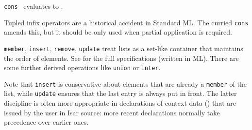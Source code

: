 \begin{isabellebody}
\begin{isamarkuptext}
  \begin{description}

  \item \verb|cons|~ evaluates to .

  Tupled infix operators are a historical accident in Standard ML.
  The curried \verb|cons| amends this, but it should be only used when
  partial application is required.

  \item \verb|member|, \verb|insert|, \verb|remove|, \verb|update| treat
  lists as a set-like container that maintains the order of elements.
  See \hyperlink{file.~~/src/Pure/library.ML}{\mbox{}} for the full specifications
  (written in ML).  There are some further derived operations like
  \verb|union| or \verb|inter|.

  Note that \verb|insert| is conservative about elements that are
  already a \verb|member| of the list, while \verb|update| ensures that
  the last entry is always put in front.  The latter discipline is
  often more appropriate in declarations of context data
  () that are issued by the user in Isar
  source: more recent declarations normally take precedence over
  earlier ones.


\end{description}
\end{isamarkuptext}
\end{isabellebody}
